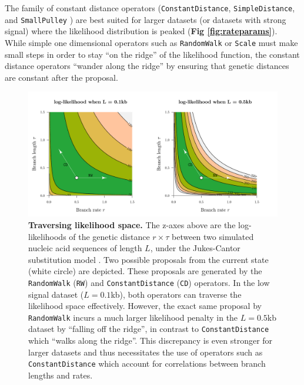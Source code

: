 \documentclass[10pt,letterpaper]{article}
\begin{document}
The family of constant distance operators (\texttt{ConstantDistance}, \texttt{SimpleDistance}, and \texttt{SmallPulley} \cite{zhang2020improving}) are best suited for larger datasets (or datasets with strong signal) where the likelihood distribution is peaked (\textbf{Fig \ref{fig:rateparams}}).
While simple one dimensional operators such as \texttt{RandomWalk} or \texttt{Scale} must make small steps in order to stay ``on the ridge'' of the likelihood function, the constant distance operators ``wander along the ridge''  by ensuring that genetic distances are constant after the proposal.



\begin{figure}[!h]
\includegraphics[width=\textwidth]{Figures/correlations.pdf}
\caption{\textbf{Traversing likelihood space.}
The z-axes above are the log-likelihoods of the genetic distance $r \times \tau$ between two simulated nucleic acid sequences of length $L$, under the Jukes-Cantor substitution model \cite{jukes1969evolution}. 
Two possible proposals from the current state (white circle) are depicted.
These proposals are generated by the \texttt{RandomWalk} (\texttt{RW}) and \texttt{ConstantDistance} (\texttt{CD}) operators.
In the low signal dataset ($L=0.1$kb), both operators can traverse the likelihood space effectively.
 However, the exact same proposal by \texttt{RandomWalk} incurs a much larger likelihood penalty in the $L=0.5$kb dataset by ``falling off the ridge'', in contrast to \texttt{ConstantDistance} which ``walks along the ridge''.
 This discrepancy is even stronger for larger datasets and thus necessitates the use of operators such as \texttt{ConstantDistance} which account for correlations between branch lengths and rates. }
\label{fig:landscape}
\end{figure}
\end{document}
